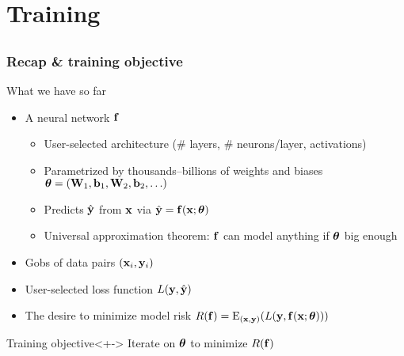 \section{Training}

\subsection{}

\begin{frame}
    \frametitle{Recap \& training objective}

    What we have so far
    \begin{itemize}
        \item<+-> A neural network $\mathbf{f}$
        \begin{itemize}
            \item User-selected \alert{architecture} (\# layers, \# neurons/layer, activations)
            \item Parametrized by thousands--billions of \alert{weights} and \alert{biases} $\bm{\theta} = (\mathbf{W}_1, \mathbf{b}_1, \mathbf{W}_2, \mathbf{b}_2, \ldots)$
            \item \alert{Predicts} $\hat{\mathbf{y}}$ from $\mathbf{x}$ via $\hat{\mathbf{y}} = \mathbf{f}(\mathbf{x}; \bm{\theta})$
            \item \alert{Universal approximation theorem}: $\mathbf{f}$ can model anything if $\bm{\theta}$ big enough
        \end{itemize}
        \item<+-> Gobs of \alert{data} pairs $(\mathbf{x}_i, \mathbf{y}_i)$
        \item<+-> User-selected \alert{loss function} $L(\mathbf{y}, \hat{\mathbf{y}})$
        \item<+-> The desire to minimize \alert{model risk} $R(\mathbf{f}) = \operatorname{\mathrm{E}}_{(\mathbf{x}, \mathbf{y})}(L(\mathbf{y}, \mathbf{f}(\mathbf{x}; \bm{\theta})))$
    \end{itemize}

    \begin{block}{Training objective}<+->
        Iterate on $\bm{\theta}$ to minimize $R(\mathbf{f})$
    \end{block}
\end{frame}


